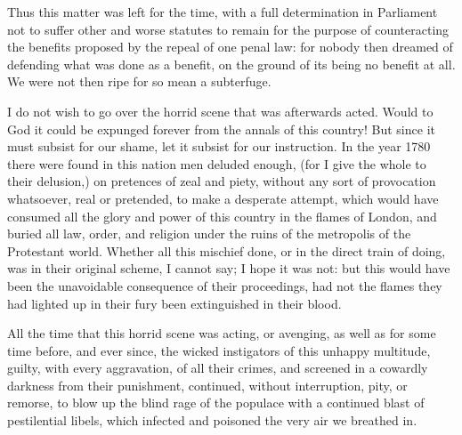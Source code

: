 Thus this matter was left for the time, with a full determination in Parliament not to suffer other and worse statutes to remain for the purpose of counteracting the benefits proposed by the repeal of one penal law: for nobody then dreamed of defending what was done as a benefit, on the ground of its being no benefit at all. We were not then ripe for so mean a subterfuge.

I do not wish to go over the horrid scene that was afterwards acted. Would to God it could be expunged forever from the annals of this country! But since it must subsist for our shame, let it subsist for our instruction. In the year 1780 there were found in this nation men deluded enough, (for I give the whole to their delusion,) on pretences of zeal and piety, without any sort of provocation whatsoever, real or pretended, to make a desperate attempt, which would have consumed all the glory and power of this country in the flames of London, and buried all law, order, and religion under the ruins of the metropolis of the Protestant world. Whether all this mischief done, or in the direct train of doing, was in their original scheme, I cannot say; I hope it was not: but this would have been the unavoidable consequence of their proceedings, had not the flames they had lighted up in their fury been extinguished in their blood.

All the time that this horrid scene was acting, or avenging, as well as for some time before, and ever since, the wicked instigators of this unhappy multitude, guilty, with every aggravation, of all their crimes, and screened in a cowardly darkness from their punishment, continued, without interruption, pity, or remorse, to blow up the blind rage of the populace with a continued blast of pestilential libels, which infected and poisoned the very air we breathed in.

